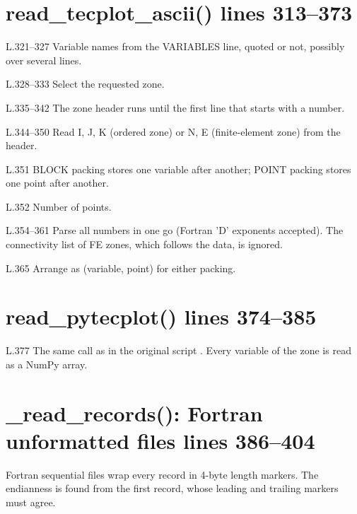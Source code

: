 \section*{\normalsize read\_tecplot\_ascii() \hfill{\small\mdseries\color{gray}lines 313--373}}

\begin{lines}
\item[L.321–327] Variable names from the VARIABLES line, quoted or not, possibly over several lines.
\item[L.328–333] Select the requested zone.
\item[L.335–342] The zone header runs until the first line that starts with a number.
\item[L.344–350] Read I, J, K (ordered zone) or N, E (finite-element zone) from the header.
\item[L.351] BLOCK packing stores one variable after another; POINT packing stores one point after another.
\item[L.352] Number of points.
\item[L.354–361] Parse all numbers in one go (Fortran 'D' exponents accepted). The connectivity list of FE zones, which follows the data, is ignored.
\item[L.365] Arrange as (variable, point) for either packing.
\end{lines}
\section*{\normalsize read\_pytecplot() \hfill{\small\mdseries\color{gray}lines 374--385}}

\begin{lines}
\item[L.377] The same call as in the original script . Every variable of the zone is read as a NumPy array.
\end{lines}
\section*{\normalsize \_read\_records(): Fortran unformatted files \hfill{\small\mdseries\color{gray}lines 386--404}}

Fortran sequential files wrap every record in 4-byte length markers. The endianness is found from the first record, whose leading and trailing markers must agree.

